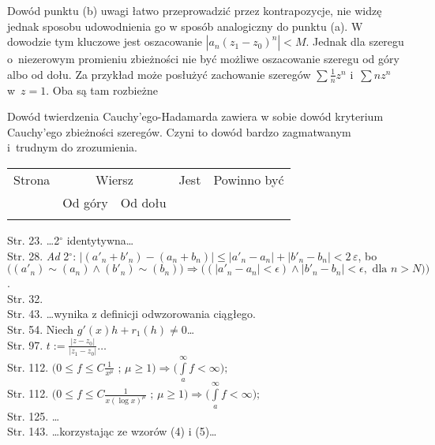 \documentclass[a4paper,11pt]{article}
\numberwithin{equation}{section}
\begin{document}
\noindent
{} Dowód punktu (b) uwagi łatwo przeprowadzić przez kontrapozycje,
nie widzę jednak sposobu udowodnienia go w sposób analogiczny do punktu
(a). W dowodzie tym kluczowe jest oszacowanie
\mbox{$| a_{ n } ( z_{ 1 } - z_{ 0 } )^{ n } | < M$.} Jednak dla szeregu
o~niezerowym promieniu zbieżności nie być możliwe oszacowanie szeregu od
góry albo od dołu. Za przykład może posłużyć zachowanie szeregów
$\sum \frac{ 1 }{ n } z^{ n }$ i~$\sum n z^{ n }$ w~$z = 1$. Oba są tam
rozbieżne

\VerSpaceFour





\noindent
{} Dowód twierdzenia Cauchy’ego-Hadamarda zawiera w sobie dowód
kryterium Cauchy’ego zbieżności szeregów. Czyni to dowód bardzo zagmatwanym
i~trudnym do zrozumienia.





\newpage



\begin{center}

  \begin{tabular}{|c|c|c|c|c|}
    \hline
    Strona & \multicolumn{2}{c|}{Wiersz} & Jest
                              & Powinno być \\ \cline{2-3}
    & Od góry & Od dołu & & \\
    \hline
    & & & & \\
    \hline
  \end{tabular}

\end{center}

\VerSpaceTwo


\noindent
Str. 23. \ldots 2$^{ \circ }$ identytywna\ldots \\
Str. 28. \textit{Ad} 2$^{ \circ }$: $| ( a'_{ n } + b'_{ n } )
- ( a_{ n } + b_{ n } ) |  \leq | a'_{ n } - a_{ n } | + | b'_{ n } - b_{ n } |
< 2 \, \varepsilon$, bo \\
$\big( ( a'_{ n } ) \sim ( a_{ n } ) \wedge( b'_{ n } ) \sim ( b_{ n } ) \big)
\Rightarrow \big( ( | a'_{ n } - a_{ n } | < \epsilon )
\wedge | b'_{ n } - b_{ n } | < \epsilon, \textrm{ dla } n > N ) \big)$. \\
Str. 32. \\
Str. 43. \ldots wynika z definicji odwzorowania ciągłego. \\
Str. 54. Niech $g'( x ) h + r_{ 1 }( h ) \neq 0$\ldots \\
Str. 97. $t := \frac{ | z - z_{ 0 } | }{ | z_{ 1 } - z_{ 0 } | }
\textrm{\ldots}$ \\
Str. 112.
$\big( 0 \leq f \leq C \frac{ 1 }{ x^{ \mu } } \textrm{ ; } \mu \geq 1 \big)
\Rightarrow \big( \int \limits^{ \infty }_{ a } f < \infty \big) \textrm{;}$ \\
Str. 112.
$\big( 0 \leq f \leq C \frac{ 1 }{ x ( \log x )^{ \mu } } \textrm{ ; } \mu \geq 1 \big)
\Rightarrow \big( \int \limits^{ \infty }_{ a } f < \infty \big) \textrm{;}$ \\
Str. 125. \ldots \\
Str. 143. \ldots korzystając ze wzorów (4) i (5)\ldots
\end{document}
